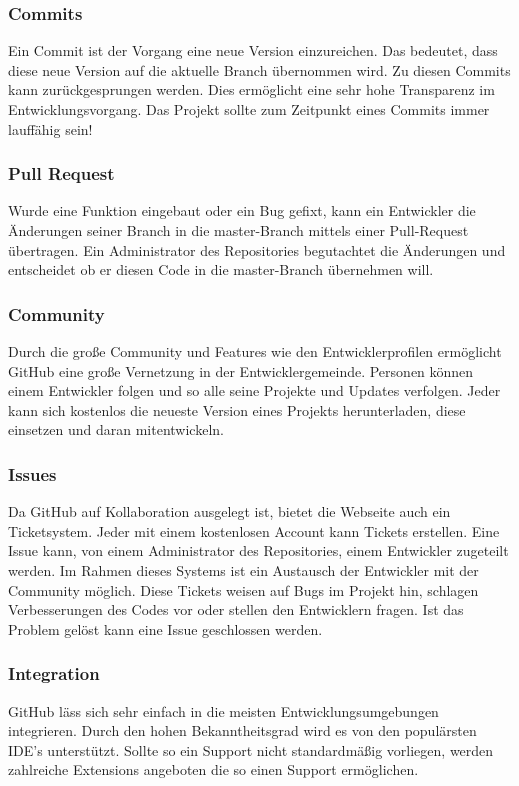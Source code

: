 \documentclass[FIPLY_base.tex]{subfiles}
\begin{document}
\newpage
\subsubsection{Commits}
Ein Commit ist der Vorgang eine neue Version einzureichen.
Das bedeutet, dass diese neue Version auf die aktuelle Branch übernommen wird.
Zu diesen Commits kann zurückgesprungen werden. Dies ermöglicht eine sehr hohe Transparenz im Entwicklungsvorgang.
Das Projekt sollte zum Zeitpunkt eines Commits immer lauffähig sein! 
 
\subsubsection{Pull Request}
Wurde eine Funktion eingebaut oder ein Bug gefixt, kann ein Entwickler die Änderungen seiner Branch in die master-Branch mittels einer Pull-Request übertragen. 
Ein Administrator des Repositories begutachtet die Änderungen und entscheidet ob er diesen Code in die master-Branch übernehmen will.

\subsubsection{Community}
Durch die große Community und Features wie den Entwicklerprofilen ermöglicht GitHub eine große Vernetzung in der Entwicklergemeinde.
Personen können einem Entwickler folgen und so alle seine Projekte und Updates verfolgen.
Jeder kann sich kostenlos die neueste Version eines Projekts herunterladen, diese einsetzen und daran mitentwickeln.

\subsubsection{Issues}
Da GitHub auf Kollaboration ausgelegt ist, bietet die Webseite auch ein Ticketsystem.
Jeder mit einem kostenlosen Account kann Tickets erstellen. Eine Issue kann, von einem Administrator des Repositories, einem Entwickler zugeteilt werden.
Im Rahmen dieses Systems ist ein Austausch der Entwickler mit der Community möglich.
Diese Tickets weisen auf Bugs im Projekt hin, schlagen Verbesserungen des Codes vor oder stellen den Entwicklern fragen.
Ist das Problem gelöst kann eine Issue geschlossen werden.

\subsubsection{Integration}
GitHub läss sich sehr einfach in die meisten Entwicklungsumgebungen integrieren. 
Durch den hohen Bekanntheitsgrad wird es von den populärsten IDE's unterstützt.
Sollte so ein Support nicht standardmäßig vorliegen, werden zahlreiche Extensions angeboten die so einen Support ermöglichen.
\end{document}
